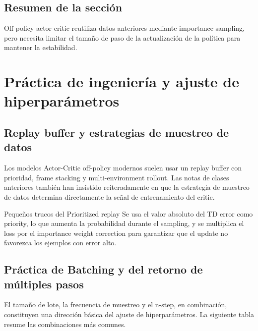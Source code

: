 \documentclass[a4paper]{article}
\begin{document}
\subsection{Resumen de la sección}

Off-policy actor-critic reutiliza datos anteriores mediante importance sampling, pero necesita limitar el tamaño de paso de la actualización de la política para mantener la estabilidad.

\section{Práctica de ingeniería y ajuste de hiperparámetros}

\subsection{Replay buffer y estrategias de muestreo de datos}

Los modelos Actor-Critic off-policy modernos suelen usar un replay buffer con prioridad, frame stacking y multi-environment rollout. Las notas de clases anteriores también han insistido reiteradamente en que la estrategia de muestreo de datos determina directamente la señal de entrenamiento del critic.

\begin{knowledgebox}{Pequeños trucos del Prioritized replay}
Se usa el valor absoluto del TD error como priority, lo que aumenta la probabilidad durante el sampling, y se multiplica el loss por el importance weight correction para garantizar que el update no favorezca los ejemplos con error alto.
\end{knowledgebox}

\subsection{Práctica de Batching y del retorno de múltiples pasos}

El tamaño de lote, la frecuencia de muestreo y el n-step, en combinación, constituyen una dirección básica del ajuste de hiperparámetros. La siguiente tabla resume las combinaciones más comunes.
\end{document}
